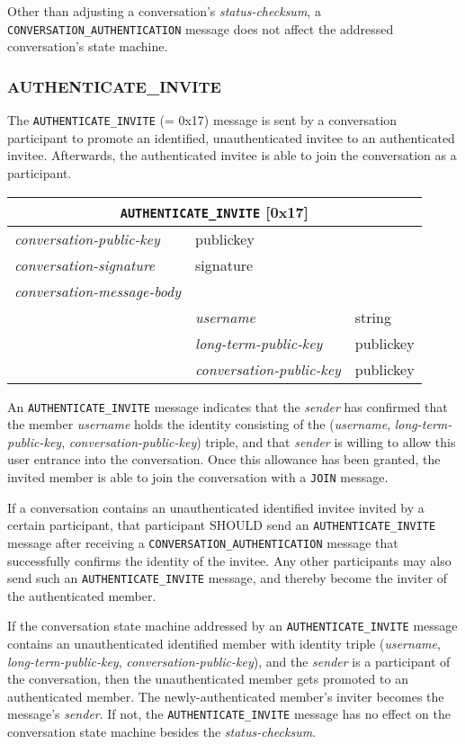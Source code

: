 \documentclass{article}
\def\message#1{\texttt{#1}}
\def\field#1{\textit{#1}}
\def\smfield#1{\textsl{#1}}
\def\type#1{\textsf{#1}}
\newenvironment{conversationmessage}[2]{
\newcommand{\messagefield}[2]{
& \field{##1} & \type{##2} \\
\hline
}
\hspace{2em minus 2em}\begin{tabular}{|l|l|l|}
\hline
\multicolumn{3}{|c|}{\message{#1} [#2]} \\
\hline
\hline
\field{conversation-public-key} & \multicolumn{2}{l|}{\type{publickey}} \\
\hline
\field{conversation-signature} & \multicolumn{2}{l|}{\type{signature}} \\
\hline
\field{conversation-message-body} & \multicolumn{2}{l|}{} \\
\hline
}{
\end{tabular}
}
\begin{document}
Other than adjusting a conversation's \smfield{status-checksum}, a \message{CONVERSATION\_AUTHENTICATION} message does not affect the addressed conversation's state machine.


\subsubsection{AUTHENTICATE\_INVITE}
\label{sec:messages/authenticate-invite}

The \message{AUTHENTICATE\_INVITE} (= 0x17) message is sent by a conversation participant to promote an identified, unauthenticated invitee to an authenticated invitee.
Afterwards, the authenticated invitee is able to join the conversation as a participant.

\begin{conversationmessage}{AUTHENTICATE\_INVITE}{0x17}
\messagefield{username}{string}
\messagefield{long-term-public-key}{publickey}
\messagefield{conversation-public-key}{publickey}
\end{conversationmessage}

An \message{AUTHENTICATE\_INVITE} message indicates that the \field{sender} has confirmed that the member \field{username} holds the identity consisting of the (\field{username}, \field{long-term-public-key}, \field{conversation-public-key}) triple, and that \field{sender} is willing to allow this user entrance into the conversation.
Once this allowance has been granted, the invited member is able to join the conversation with a \message{JOIN} message.

If a conversation contains an unauthenticated identified invitee invited by a certain participant, that participant SHOULD send an \message{AUTHENTICATE\_INVITE} message after receiving a \message{CONVERSATION\_AUTHENTICATION} message that successfully confirms the identity of the invitee.
Any other participants may also send such an \message{AUTHENTICATE\_INVITE} message, and thereby become the inviter of the authenticated member.

If the conversation state machine addressed by an \message{AUTHENTICATE\_INVITE} message contains an unauthenticated identified member with identity triple (\field{username}, \field{long-term-public-key}, \field{conversation-public-key}), and the \field{sender} is a participant of the conversation, then the unauthenticated member gets promoted to an authenticated member.
The newly-authenticated member's inviter becomes the message's \field{sender}.
If not, the \message{AUTHENTICATE\_INVITE} message has no effect on the conversation state machine besides the \smfield{status-checksum}.
\end{document}
